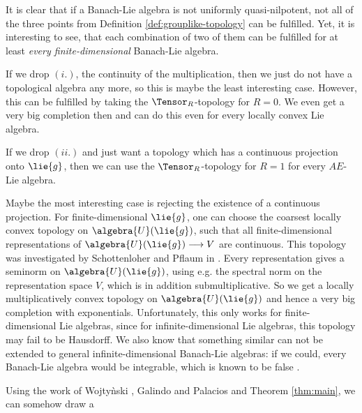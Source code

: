\documentclass[
11pt,                          %
english                        %
]{article}
\begin{document}
\begin{remark}
	It is clear that if a Banach-Lie algebra is not uniformly quasi-nilpotent,
	not all of the three points from Definition \ref{def:grouplike-topology} can be
	fulfilled. Yet, it is interesting to see, that each combination of two of them
	can be fulfilled for at least \emph{every finite-dimensional} Banach-Lie 
	algebra.
	\begin{remarklist}
		\item
		If we drop $(i.)$, the continuity of the multiplication, then we just do not
		have a topological algebra any more, so this is maybe the least interesting
		case. However, this can be fulfilled by taking the $\Tensor_R$-topology for 
		$R = 0$. We even get a very big completion then and can do this even for
		every locally convex Lie algebra.
		
		\item
		If we drop $(ii.)$ and just want a topology which has a continuous 
		projection onto $\lie{g}$, then we can use the $\Tensor_R$-topology for 
		$R = 1$ for every $AE$-Lie algebra.

		\item
		Maybe the most interesting case is rejecting the existence of a continuous 
		projection. For finite-dimensional $\lie{g}$, one can choose 
		the coarsest locally convex topology on $\algebra{U}(\lie{g})$, such that all 
		finite-dimensional representations of $\algebra{U}(\lie{g}) 
		\longrightarrow V$ are continuous. This topology was investigated by
		Schottenloher and Pflaum in \cite{pflaum.schottenloher:1998a}.
		Every representation gives a seminorm on $\algebra{U}(\lie{g})$, using e.g.
		the spectral norm on the representation space $V$, which is in addition
		submultiplicative. So we get a locally multiplicatively convex topology
		on $\algebra{U}(\lie{g})$ and hence a very big completion with exponentials.
		Unfortunately, this only works for finite-dimensional Lie algebras, since for 
		infinite-dimensional Lie algebras, this topology may fail to be Hausdorff. We 
		also know that something similar can not be extended to general 
		infinite-dimensional Banach-Lie algebras: if we could, every Banach-Lie 
		algebra would be integrable, which is known to be false 
		\cite[Remark 1.14.15]{duistermaat.kolk:2000a}.
	\end{remarklist}
\end{remark}
Using the work of Wojty\`nski \cite{wojtynski:1998a}, Galindo and Palacios 
\cite{galindo.palacios:2012a} and Theorem \ref{thm:main}, we can somehow draw a 
\end{document}
